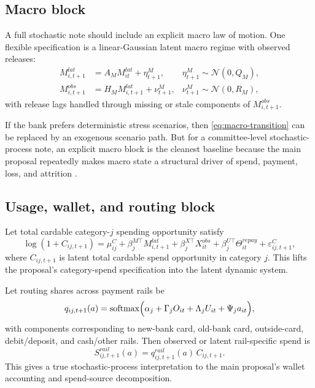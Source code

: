 \documentclass[11pt]{article}
\newcommand{\1}{\mathbf{1}}
\DeclareMathOperator{\softmax}{softmax}
\theoremstyle{definition}
\begin{document}
\subsection{Macro block}

A full stochastic note should include an explicit macro law of motion. One
flexible specification is a linear-Gaussian latent macro regime with observed
releases:
\begin{align}
  M^{lat}_{i,t+1} &= A_M M^{lat}_{it} + \eta^M_{t+1},
    &\eta^M_{t+1}\sim\mathcal{N}(0,Q_M),
    \label{eq:macro-transition}\\
  M^{obs}_{i,t+1} &= H_M M^{lat}_{i,t+1} + \nu^M_{t+1},
    &\nu^M_{t+1}\sim\mathcal{N}(0,R_M),
    \label{eq:macro-observation}
\end{align}
with release lags handled through missing or stale components of
$M^{obs}_{i,t+1}$.

If the bank prefers deterministic stress scenarios, then
\eqref{eq:macro-transition} can be replaced by an exogenous scenario path. But
for a committee-level stochastic-process note, an explicit macro block is the
cleanest baseline because the main proposal repeatedly makes macro state a
structural driver of spend, payment, loss, and attrition
\citep{ganong2019unemployment,johnson2004rebates,gross2001liquidity,baker2020epidemic}.

\subsection{Usage, wallet, and routing block}

Let total cardable category-$j$ spending opportunity satisfy
\begin{equation}
  \log(1+C_{ij,t+1})
  =
  \mu_{ij}^{C} + \beta_j^{M\top} M^{lat}_{i,t+1}
  + \beta_j^{X\top} X_{it}^{obs}
  + \beta_j^{U\top} \Theta^{repay}_{it}
  + \varepsilon^C_{ij,t+1},
  \label{eq:cardable-spend-process}
\end{equation}
where $C_{ij,t+1}$ is latent total cardable spend opportunity in category $j$.
This lifts the proposal's category-spend specification into the latent dynamic
system.

Let routing shares across payment rails be
\begin{equation}
  q_{ij,t+1}(a)
  =
  \softmax\Bigl(
    \alpha_j + \Gamma_j O_{it} + \Lambda_j U_{it} + \Psi_j a_{it}
  \Bigr),
  \label{eq:routing-softmax}
\end{equation}
with components corresponding to new-bank card, old-bank card, outside-card,
debit/deposit, and cash/other rails. Then observed or latent rail-specific spend
is
\begin{equation}
  S^{rail}_{ij,t+1}(a) = q^{rail}_{ij,t+1}(a)\,C_{ij,t+1}.
  \label{eq:rail-specific-spend}
\end{equation}
This gives a true stochastic-process interpretation to the main proposal's
wallet accounting and spend-source decomposition.
\end{document}
